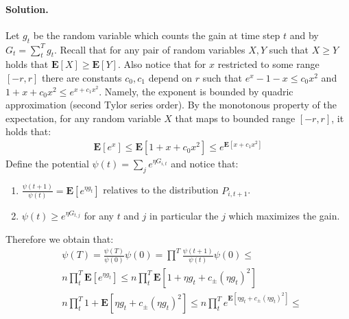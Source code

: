 \documentclass{article}
\newcommand{\expp}[1]{ \mathbf{E} \left[ {#1} \right]}
\begin{document}
\begin{multicols*}{2}
  \paragraph{Solution.}
  Let $g_{t}$ be the random variable which counts the gain at time step $t$ and by $G_{t} = \sum_{t}^{T}{g_{t}}$. Recall that for any pair of random variables $X, Y$ such that $X \ge Y$ holds that $\expp{X} \ge \expp{Y}$. Also notice that for $x$ restricted to some range $[-r,r]$ there are constants $c_{0}, c_{1}$ depend on $r$ such that $ e^{x} - 1 - x \le c_{0}x^{2}$ and $1 + x + c_{0}x^{2} \le e^{x+c_{1}x^{2}}$. Namely, the exponent is bounded by quadric approximation (second Tylor series order). By the monotonous property of the expectation, for any random variable $X$ that maps to bounded range $[-r,r]$, it holds that:
  \begin{equation*}
    \begin{split}
      \expp{e^{x}} \le \expp{ 1 + x + c_{0}x^{2}} \le  e^{ \expp{ x+c_{1}x^{2}}}
    \end{split}
  \end{equation*}
  Define the potential $\psi\left( t \right) =  \sum_{j}{ e^{\eta G_{i,t}}}$ and notice that:
    \begin{enumerate}
      \item $ \frac{\psi\left( t+1 \right)}{\psi\left( t \right)} = \expp{e^{\eta g_{t}}}$ relatives to the distribution $P_{i,t+1}$. 
      \item $ \psi\left( t \right) \ge e^{\eta G_{t,j}} $ for any $t$ and $j$ in particular the $j$ which maximizes the gain. 
    \end{enumerate}
Therefore we obtain that: 
\begin{equation*}
  \begin{split}
    & \psi\left( T \right) =  \frac{\psi\left( T \right)}{\psi\left( 0 \right)}\psi\left( 0 \right) = \prod^{T}{\frac{\psi\left( t+1 \right)}{\psi\left( t \right)} }\psi\left( 0 \right) \le \\
  & n \prod^{T}_{t}{\expp{ e^{\eta g_{t}} }}\le n \prod^{T}_{t}{\expp{ 1 + \eta g_{t} + c_{\pm}\left( \eta g_{t} \right)^{2} }} \\
& n \prod^{T}_{t}{ 1 + \expp{ \eta g_{t} + c_{\pm}\left( \eta g_{t} \right)^{2} }} \le  
 n \prod^{T}_{t}{ e^{\expp{ \eta g_{t} + c_{\pm}\left( \eta g_{t} \right)^{2} }}} \le \\ 

\end{split}
\end{equation*}
\end{multicols*}
\end{document}

